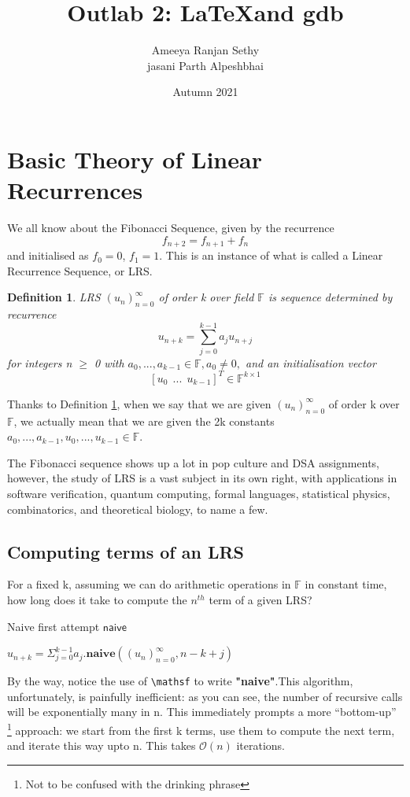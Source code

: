 \documentclass{article}
\newtheorem{definition}{Definition}[section]
\begin{document}
\title{Outlab 2: \LaTeX and gdb}
\author{Ameeya Ranjan Sethy \\ jasani Parth Alpeshbhai}
\date{Autumn 2021}
\maketitle
\tableofcontents
\thispagestyle{empty}
\setcounter{page}{0}
\newpage
\section{Basic Theory of Linear Recurrences}
We all know about the Fibonacci Sequence, given by the recurrence$$f_{n+2} = f_{n+1} + f_{n}$$and initialised as $f_0 = 0$, $f_1 = 1$. This is an instance of what is called a Linear Recurrence Sequence, or LRS.

\vspace{1em}
\begin{definition}
\label{def1.1}
LRS $(u_n)_{n=0}^{\infty}$ of order k over field $\mathbb{F}$ is sequence determined by recurrence
\begin{equation}
\label{eq:one}
    u_{n+k} = \sum_{j=0}^{k-1}a_{j}u_{n+j}
\end{equation}
for integers n $\ge$ 0 with  $a_0,...,a_{k-1} \in \mathbb{F}, a_0 \ne 0,$ and an initialisation vector $$[u_0 ~~ ... ~~ u_{k-1}]^{T} \in \mathbb{F}^{k\times1}$$
\end{definition}
Thanks to Definition \ref{def1.1}, when we say that we are given $(u_n)_{n=0}^{\infty}$ of order k over $\mathbb{F}$, we actually mean that we are given the 2k constants $a_0,...,a_{k-1},u_0,...,u_{k-1} \in \mathbb{F}.$

The Fibonacci sequence shows up a lot in pop culture and DSA assignments, however, the study of LRS is a vast subject in its own right, with applications in software verification, quantum computing, formal languages, statistical physics, combinatorics, and theoretical biology, to name a few.

\subsection{Computing terms of an LRS}
For a fixed k, assuming we can do arithmetic operations in $\mathbb{F}$ in constant time, how long does it take to compute the $n^{th}$ term of a given LRS?

\begin{algorithm}[ht]
\label{algo1}
\caption {Naive first attempt $\mathsf{naive}$}
\SetAlgoLined
\DontPrintSemicolon
{}
\Return $u_{n+k} = \Sigma_{j=0}^{k-1}a_{j}.\textbf{naive}((u_n)_{n=0}^{\infty}, n-k+j)$
\end{algorithm}
By the way, notice the use of \verb=\mathsf= to write \textbf{"naive"}.This algorithm, unfortunately, is painfully inefficient: as you can see, the number of recursive calls will be exponentially many in n. This immediately prompts a more “bottom-up” \footnote[3]{Not to be confused with the drinking phrase} approach: we start from the first k terms, use them to compute the next term, and iterate this way upto n. This takes $\mathcal{O}(n)$ iterations.
\end{document}
